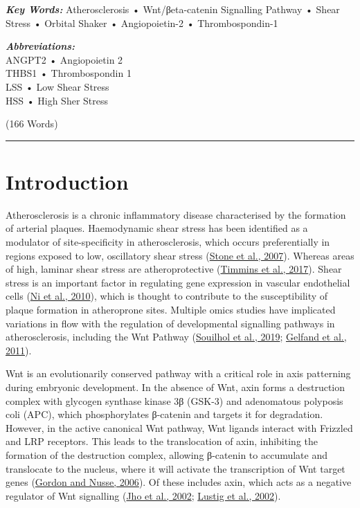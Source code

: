\documentclass[
  11pt,
]{article}
\begin{document}
\begin{center}
\textbf{\textit{Key Words:}} Atherosclerosis • Wnt/βeta-catenin Signalling Pathway • Shear Stress • Orbital Shaker • Angiopoietin-2 • Thrombospondin-1\\
\end{center}

\begin{center}
\textbf{\textit{Abbreviations:}} \\
ANGPT2 • Angiopoietin 2\\
THBS1 • Thrombospondin 1\\
LSS • Low Shear Stress\\
HSS • High Sher Stress
\end{center}

\begin{flushright}
(166 Words)\\
\end{flushright}
\rule{\textwidth}{0.4pt}

\hypertarget{introduction}{%
\section{Introduction}\label{introduction}}

Atherosclerosis is a chronic inflammatory disease characterised by the formation of arterial plaques.
Haemodynamic shear stress has been identified as a modulator of site-specificity in atherosclerosis, which occurs preferentially in regions exposed to low, oscillatory shear stress (\protect\hyperlink{ref-stone2007}{Stone et al., 2007}). Whereas areas of high, laminar shear stress are atheroprotective (\protect\hyperlink{ref-timmins2017}{Timmins et al., 2017}). Shear stress is an important factor in regulating gene expression in vascular endothelial cells (\protect\hyperlink{ref-Ni2010}{Ni et al., 2010}), which is thought to contribute to the susceptibility of plaque formation in atheroprone sites. Multiple omics studies have implicated variations in flow with the regulation of developmental signalling pathways in atherosclerosis, including the Wnt Pathway (\protect\hyperlink{ref-Souilhol2020}{Souilhol et al., 2019}; \protect\hyperlink{ref-Gelfand2011}{Gelfand et al., 2011}).

Wnt is an evolutionarily conserved pathway with a critical role in axis patterning during embryonic development.
In the absence of Wnt, axin forms a destruction complex with glycogen synthase kinase 3β (GSK-3) and adenomatous polyposis coli (APC), which phosphorylates β-catenin and targets it for degradation.
However, in the active canonical Wnt pathway, Wnt ligands interact with Frizzled and LRP receptors.
This leads to the translocation of axin, inhibiting the formation of the destruction complex, allowing β-catenin to accumulate and translocate to the nucleus, where it will activate the transcription of Wnt target genes (\protect\hyperlink{ref-gordon2006}{Gordon and Nusse, 2006}). Of these includes axin, which acts as a negative regulator of Wnt signalling (\protect\hyperlink{ref-Jho2002}{Jho et al., 2002}; \protect\hyperlink{ref-Lustig2002}{Lustig et al., 2002}).
\end{document}
